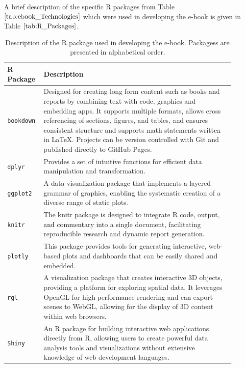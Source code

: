 \documentclass[11pt]{article}
\begin{document}
A brief description of the specific R packages from Table $\ref{tab:ebook_Technologies}$ which were used in developing the e-book is given in Table $\ref{tab:R_Packages}$.
\renewcommand\arraystretch{1.10}
\begin{table}[H]
\setlength{\belowcaptionskip}{-25pt}
\begin{center}
\begin{tabular}{| p{0.125\linewidth} | p{0.80\linewidth} |}
\hline
\textbf{R Package}	&	\textbf{Description}\\
\hline
\texttt{bookdown}	&	Designed for creating long form content such as books and reports by combining text with code, graphics and embedding apps. It supports multiple formats, allows cross referencing of sections, figures, and tables, and ensures consistent structure and supports math statements written in LaTeX. Projects can be version controlled with Git and published directly to GitHub Pages.\\
\hline
\texttt{dplyr}		&	Provides a set of intuitive functions for efficient data manipulation and transformation.\\
\hline
\texttt{ggplot2}		&	A data visualization package that implements a layered grammar of graphics, enabling the systematic creation of a diverse range of static plots.\\
\hline
\texttt{knitr}		&	The knitr package is designed to integrate R code, output, and commentary into a single document, facilitating reproducible research and dynamic report generation.\\
\hline
\texttt{plotly}		&	This package provides tools for generating interactive, web-based plots and dashboards that can be easily shared and embedded.\\
\hline
\texttt{rgl}			&	A visualization package that creates interactive 3D objects, providing a platform for exploring spatial data. It leverages OpenGL for high-performance rendering and can export scenes to WebGL, allowing for the display of 3D content within web browsers.\\
\hline
\texttt{Shiny}		&	An R package for building interactive web applications directly from R, allowing users to create powerful data analysis tools and visualizations without extensive knowledge of web development languages.\\
\hline
\end{tabular}
\caption{Description of the R package used in developing the e-book. Packagess are presented in alphabetical order.}
\label{tab:R_Packages}
\end{center}
\end{table}
\end{document}
